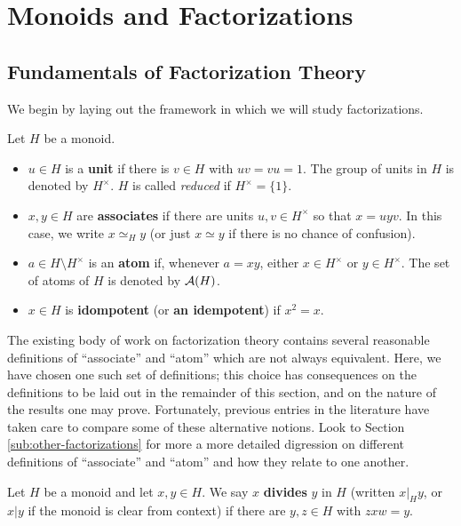 \chapter{Monoids and Factorizations} \label{ch:fundamentals}


\section{Fundamentals of Factorization Theory} \label{subsec:factorizations}
We begin by laying out the framework in which we will study factorizations.

\begin{defn} \label{defn:atom}
	Let $H$ be a monoid.
	\begin{itemize}
		\item $u\in H$ is a \textbf{unit} if there is $v\in H$ with $uv = vu = 1$.  
		The group of units in $H$ is denoted by $H^\times$.  
		$H$ is called \textit{reduced} if $H^\times = \{1\}$.
		\item $x,y\in H$ are \textbf{associates} if there are units $u,v\in H^\times$ so that $x = uyv$. In this case, we write $x \simeq_H y$ (or just $x\simeq y$ if there is no chance of confusion).
		\item $a\in H\setminus H^\times$ is an \textbf{atom} if, whenever $a = xy$, either $x\in H^\times$ or $y\in H^\times$. The set of atoms of $H$ is denoted by $\mathcal{A}(H)$.
		\item $x\in H$ is \textbf{idompotent} (or \textbf{an idempotent}) if $x^2 = x$.
	\end{itemize}
\end{defn}

The existing body of work on factorization theory contains several reasonable definitions of ``associate'' and ``atom'' which are not always equivalent.
Here, we have chosen one such set of definitions; this choice has consequences on the definitions to be laid out in the remainder of this section, and on the nature of the results one may prove.
Fortunately, previous entries in the literature have taken care to compare some of these alternative notions.
Look to Section \ref{sub:other-factorizations} for more a more detailed digression on different definitions of ``associate'' and ``atom'' and how they relate to one another.

\begin{defn} \label{def:divisibility}
	Let $H$ be a monoid and let $x,y\in H$.
	We say $x$ \textbf{divides} $y$ in $H$ (written $x|_H y$, or $x|y$ if the monoid is clear from context) if there are $y,z\in H$ with $zxw = y$.
\end{defn}

